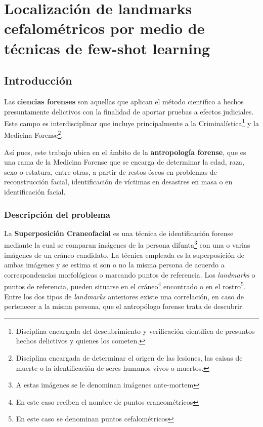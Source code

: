 
\chapter{Localización de landmarks cefalométricos por medio de técnicas de few-shot learning}


\section{Introducción}

Las \textbf{ciencias forenses} son aquellas que aplican el método científico a hechos presuntamente delictivos con la finalidad de aportar pruebas a efectos judiciales. Este campo es interdisciplinar que incluye principalmente a la Criminalística\footnote{Disciplina encargada del descubrimiento y verificación científica de presuntos hechos delictivos y quienes los cometen.} y la Medicina Forense\footnote{Disciplina encargada de determinar el origen de las lesiones, las caisas de muerte o la identificación de seres humanos vivos o muertos.}. 

\medskip

\noindent Así pues, este trabajo ubica en el ámbito de la \textbf{antropología forense}, que es una rama de la Medicina Forense que se encarga de determinar la edad, raza, sexo o estatura, entre otras, a partir de restos óseos en problemas de reconstrucción facial, identificación de víctimas en desastres en masa o en identificación facial. 


\subsection{Descripción del problema}

La \textbf{Superposición Craneofacial} es una técnica de identificación forense mediante la cual se comparan imágenes de la persona difunta\footnote{A estas imágenes se le denominan imágenes ante-mortem} con una o varias imágenes de un cráneo candidato. La técnica empleada es la superposición de ambas imágenes y se estima si son o no la misma persona de acuerdo a correspondencias morfológicas o marcando puntos de referencia. Los \textit{landmarks} o puntos de referencia, pueden situarse en el cráneo\footnote{En este caso reciben el nombre de puntos craneométricos} encontrado o en el rostro\footnote{En este caso se denominan puntos cefalométricos}. Entre los dos tipos de \textit{landmarks} anteriores existe una correlación, en caso de pertenecer a la misma persona, que el antropólogo forense trata de descubrir. 

